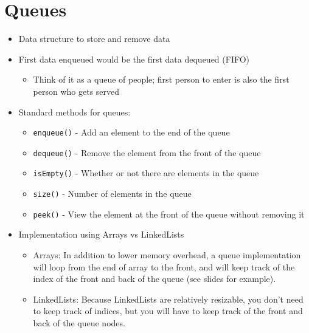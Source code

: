 \documentclass{article}
\begin{document}
\section{Queues}
\begin{itemize}
    \item Data structure to store and remove data
    \item First data enqueued would be the first data dequeued (FIFO)
        \begin{itemize}
            \item Think of it as a queue of people; first person to enter is also the first person who gets served
        \end{itemize}
    \item Standard methods for queues:
        \begin{itemize}
            \item \verb|enqueue()| - Add an element to the end of the queue
            \item \verb|dequeue()| - Remove the element from the front of the queue
            \item \verb|isEmpty()| - Whether or not there are elements in the queue
            \item \verb|size()| - Number of elements in the queue
            \item \verb|peek()| - View the element at the front of the queue without removing it
        \end{itemize}
    \item Implementation using Arrays vs LinkedLists
        \begin{itemize}
            \item Arrays: In addition to lower memory overhead, a queue implementation will loop from the end of array to the front, and will keep track of the index of the front and back of the queue (see slides for example).
            \item LinkedLists: Because LinkedLists are relatively resizable, you don't need to keep track of indices, but you will have to keep track of the front and back of the queue nodes.
        \end{itemize}
\end{itemize}
\end{document}
